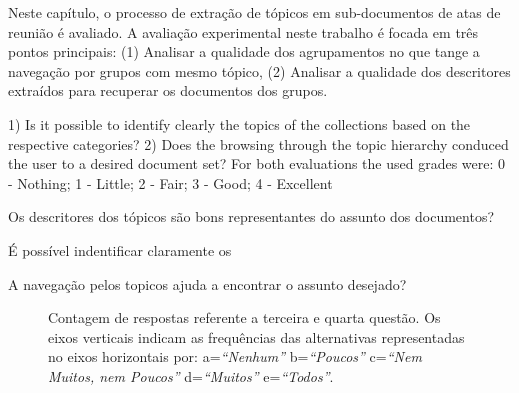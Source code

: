 Neste capítulo, o processo de extração de tópicos em sub-documentos de atas de reunião é avaliado. A avaliação experimental neste trabalho é focada em três pontos principais: 
(1) Analisar a qualidade dos agrupamentos no que tange a navegação por grupos com mesmo tópico, 
(2) Analisar a qualidade dos descritores extraídos para recuperar os documentos dos grupos.





1) Is it possible to identify clearly the topics of the collections
based on the respective categories?
2) Does the browsing through the topic hierarchy conduced
the user to a desired document set?
For both evaluations the used grades were:
0 - Nothing;
1 - Little;
2 - Fair;
3 - Good;
4 - Excellent


\item Os descritores dos tópicos são bons representantes do assunto dos documentos?
\item É possível indentificar claramente os 
\item A navegação pelos topicos ajuda a encontrar o assunto desejado?







%

%


\begin{figure}[!h] \centering     %

	\caption{Contagem de respostas referente a terceira e quarta questão. Os eixos verticais indicam as frequências das alternativas representadas no eixos horizontais por:
		a=\textit{``Nenhum''}
		b=\textit{``Poucos''}
		c=\textit{``Nem Muitos, nem Poucos''}
		d=\textit{``Muitos''}
		e=\textit{``Todos''}.
	}
	\label{fig:Q3e4}
\end{figure}

